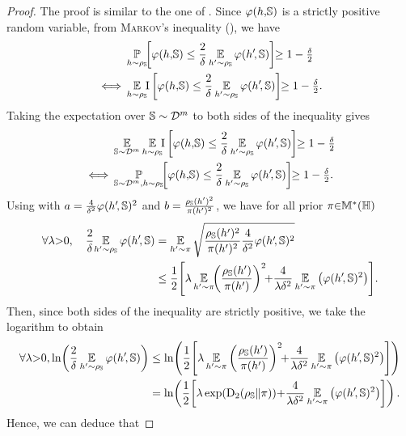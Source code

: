 \begin{noaddcontents}
\theoremdisintegratedlambda*
\begin{proof}
The proof is similar to the one of . 
Since $\varphi(h,\!\mathbb{S})$ is a strictly positive random variable, from \textsc{Markov}'s inequality (), we have
\begin{align*}
&\PP_{\h\sim \AQ}\!\!\LB\varphi(\h,\!\S)\le \frac{2}{\delta}\EE_{\h'{\sim} \AQ}\varphi(\h'\!, \S)\RB\!\!\ge 1-\tfrac{\delta}{2}\\
\iff &\EE_{\h\sim \AQ}\!\!\indic\LB\varphi(\h,\!\S)\le \frac{2}{\delta}\EE_{\h'{\sim} \AQ}\varphi(\h'\!, \S)\RB\!\!\ge 1-\tfrac{\delta}{2}.
\end{align*}
Taking the expectation over $\mathbb{S}\sim\mathcal{D}^{m}$ to both sides of the inequality gives
\begin{align*}
    &\EE_{\S\sim\D^{\m}}\EE_{\h\sim \AQ}\!\!\indic\LB\varphi(\h,\!\S)\le \frac{2}{\delta}\EE_{\h'{\sim} \AQ}\varphi(\h'\!, \S)\RB\!\!\ge 1-\tfrac{\delta}{2}\\
    \iff &\PP_{\S\sim\D^{\m},\h\sim \AQ}\!\!\LB\varphi(\h,\!\S) \le \frac{2}{\delta}\EE_{\h'{\sim} \AQ}\varphi(\h'\!, \S)\RB\!\!\ge 1-\tfrac{\delta}{2}.
\end{align*}
Using  with $a=\tfrac{4}{\delta^2}\varphi(h'\!, \mathbb{S})^2$ and $b=\tfrac{ \rho_{\mathbb{S}}(h')^2}{\pi(h')^2}$, we have for all prior $\pi{\in}\mathbb{M}^{*}(\mathbb{H})$
\begin{align*}
    \forall\lambda{>}0,\quad \frac{2}{\delta}\!\EE_{\h'{\sim} \AQ}\varphi(\h'\!, \S) &= \EE_{\h'{\sim}\P}\sqrt{\frac{ \AQ(\h')^2}{\P(\h')^2}\frac{4}{\delta^2}\varphi(\h'\!, \S)^2}\\
    &\le \frac{1}{2}\!\LB\lambda\EE_{\h'{\sim}\P}\!\!\LP\frac{ \AQ(\h')}{\P(\h')}\RP^2\!\!{+} \frac{4}{\lambda\delta^2}\EE_{\h'{\sim}\P}\LP\varphi(\h'\!, \S)^2\RP\RB\!.
\end{align*}
Then, since both sides of the inequality are strictly positive, we take the logarithm to obtain
\begin{align*}
    \forall\lambda{>}0, \ln\!\LP\frac{2}{\delta}\EE_{\h'{\sim} \AQ}\varphi(\h'\!, \S)\RP &\le \ln\!\LP\frac{1}{2}\!\LB\lambda\EE_{\h'{\sim}\P}\LP\frac{ \AQ(\h')}{\P(\h')}\RP^2\!\!{+} \frac{4}{\lambda\delta^2}\EE_{\h'{\sim}\P}\LP\varphi(\h'\!, \S)^2\RP\RB\RP\\
    &=  \ln\!\LP\frac{1}{2}\!\LB\lambda \exp(\Renyi_{2}( \AQ\|\P)){+} \frac{4}{\lambda\delta^2}\EE_{\h'{\sim}\P}\LP\varphi(\h'\!, \S)^2\RP\RB\RP.
\end{align*}
Hence, we can deduce that

\end{proof}
\end{noaddcontents}
